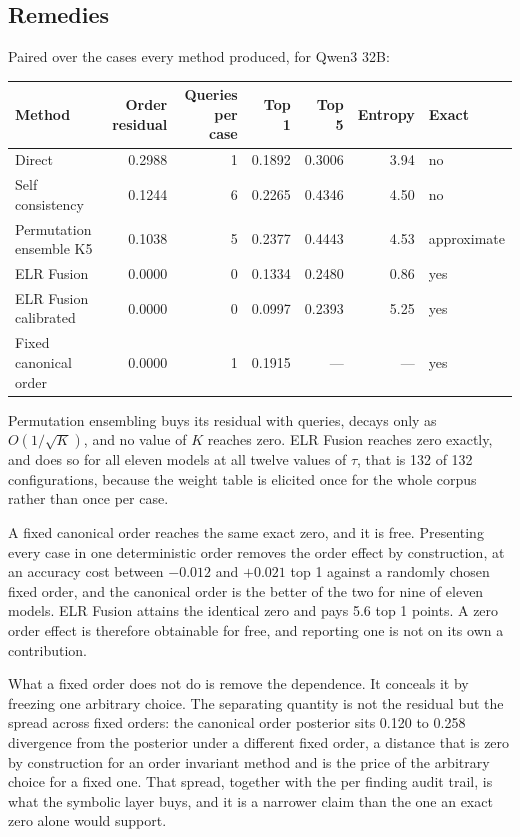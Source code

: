 \documentclass[10pt]{article}
\begin{document}
\subsection{Remedies}
Paired over the cases every method produced, for Qwen3 32B:

\begin{center}
\footnotesize
\begin{tabular}{@{}lrrrrrl@{}}
\toprule
Method & Order residual & Queries per case & Top 1 & Top 5 & Entropy & Exact \\
\midrule
Direct                  & 0.2988 & 1 & 0.1892 & 0.3006 & 3.94 & no \\
Self consistency        & 0.1244 & 6 & 0.2265 & 0.4346 & 4.50 & no \\
Permutation ensemble K5 & 0.1038 & 5 & 0.2377 & 0.4443 & 4.53 & approximate \\
ELR Fusion              & 0.0000 & 0 & 0.1334 & 0.2480 & 0.86 & yes \\
ELR Fusion calibrated   & 0.0000 & 0 & 0.0997 & 0.2393 & 5.25 & yes \\
Fixed canonical order   & 0.0000 & 1 & 0.1915 & ---    & ---  & yes \\
\bottomrule
\end{tabular}
\end{center}

Permutation ensembling buys its residual with queries, decays only as $O(1/\sqrt{K})$, and no value
of $K$ reaches zero. ELR Fusion reaches zero exactly, and does so for all eleven models at all
twelve values of $\tau$, that is 132 of 132 configurations, because the weight table is elicited
once for the whole corpus rather than once per case.

A fixed canonical order reaches the same exact zero, and it is free. Presenting every case in one
deterministic order removes the order effect by construction, at an accuracy cost between $-0.012$
and $+0.021$ top 1 against a randomly chosen fixed order, and the canonical order is the better of
the two for nine of eleven models. ELR Fusion attains the identical zero and pays 5.6 top 1 points.
A zero order effect is therefore obtainable for free, and reporting one is not on its own a
contribution.

What a fixed order does not do is remove the dependence. It conceals it by freezing one arbitrary
choice. The separating quantity is not the residual but the spread across fixed orders: the
canonical order posterior sits 0.120 to 0.258 divergence from the posterior under a different fixed
order, a distance that is zero by construction for an order invariant method and is the price of the
arbitrary choice for a fixed one. That spread, together with the per finding audit trail, is what
the symbolic layer buys, and it is a narrower claim than the one an exact zero alone would support.
\end{document}
